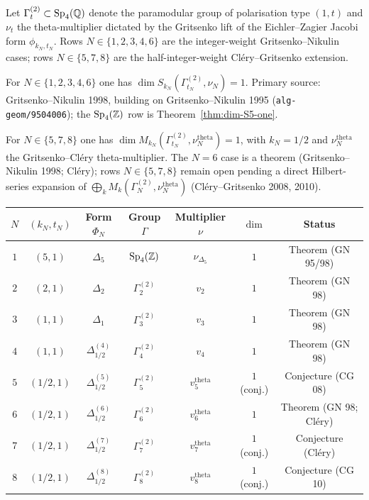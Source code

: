 Let $\Gamma^{(2)}_t\subset\mathrm{Sp}_4(\mathbb{Q})$ denote the paramodular group of
polarisation type $(1,t)$ and $\nu_t$ the theta-multiplier dictated by
the Gritsenko lift of the Eichler--Zagier Jacobi form $\phi_{k_N,t_N}$.
Rows $N\in\{1,2,3,4,6\}$ are the integer-weight Gritsenko--Nikulin
cases; rows $N\in\{5,7,8\}$ are the half-integer-weight
Cl\'ery--Gritsenko extension.

\begin{proposition}
\label{prop:dim-rows-integer}
For $N\in\{1,2,3,4,6\}$ one has $\dim S_{k_N}(\Gamma^{(2)}_{t_N},\nu_N)=1$.
Primary source: Gritsenko--Nikulin 1998, building on
Gritsenko--Nikulin 1995 (\texttt{alg-geom/9504006}); the
$\mathrm{Sp}_4(\mathbb{Z})$ row is Theorem~\ref{thm:dim-S5-one}.
\end{proposition}

\begin{conjecture}
\label{conj:dim-rows-half-integer}
For $N\in\{5,7,8\}$ one has $\dim M_{k_N}(\Gamma^{(2)}_{t_N},
\nu^{\mathrm{theta}}_N)=1$, with $k_N=1/2$ and
$\nu^{\mathrm{theta}}_N$ the Gritsenko--Cl\'ery theta-multiplier.
The $N=6$ case is a theorem (Gritsenko--Nikulin 1998; Cl\'ery);
rows $N\in\{5,7,8\}$ remain open pending a direct Hilbert-series
expansion of $\bigoplus_k M_k(\Gamma^{(2)}_N,\nu^{\mathrm{theta}}_N)$
(Cl\'ery--Gritsenko 2008, 2010).
\end{conjecture}

\begin{center}\small
\begin{tabular}{c|c|c|c|c|c|c}
\hline
$N$ & $(k_N,t_N)$ & Form $\Phi_N$ & Group $\Gamma$ & Multiplier $\nu$ &
$\dim$ & Status \\
\hline
$1$ & $(5,1)$ & $\Delta_5$ & $\mathrm{Sp}_4(\mathbb{Z})$ & $\nu_{\Delta_5}$ & $1$ &
Theorem (GN 95/98) \\
$2$ & $(2,1)$ & $\Delta_2$ & $\Gamma^{(2)}_2$ & $v_2$ & $1$ &
Theorem (GN 98)\\
$3$ & $(1,1)$ & $\Delta_1$ & $\Gamma^{(2)}_3$ & $v_3$ & $1$ &
Theorem (GN 98)\\
$4$ & $(1,1)$ & $\Delta_{1/2}^{(4)}$ & $\Gamma^{(2)}_4$ & $v_4$ & $1$ &
Theorem (GN 98)\\
$5$ & $(1/2,1)$ & $\Delta_{1/2}^{(5)}$ & $\Gamma^{(2)}_5$ &
$v_5^{\mathrm{theta}}$ & $1$ (conj.) &
Conjecture (CG 08)\\
$6$ & $(1/2,1)$ & $\Delta_{1/2}^{(6)}$ & $\Gamma^{(2)}_6$ &
$v_6^{\mathrm{theta}}$ & $1$ &
Theorem (GN 98; Cl\'ery)\\
$7$ & $(1/2,1)$ & $\Delta_{1/2}^{(7)}$ & $\Gamma^{(2)}_7$ &
$v_7^{\mathrm{theta}}$ & $1$ (conj.) &
Conjecture (Cl\'ery)\\
$8$ & $(1/2,1)$ & $\Delta_{1/2}^{(8)}$ & $\Gamma^{(2)}_8$ &
$v_8^{\mathrm{theta}}$ & $1$ (conj.) &
Conjecture (CG 10)\\
\hline
\end{tabular}
\end{center}

